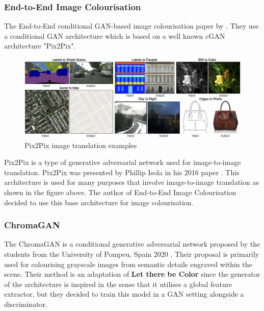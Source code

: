 \subsubsection*{End-to-End Image Colourisation}

The End-to-End conditional GAN-based image colourisation paper by \cite{inproceedings}. They use a conditional GAN architecture which is based on a well known cGAN architecture "Pix2Pix".

\begin{figure}[H]
    \centering
    \includegraphics[width=0.7\columnwidth]{sections/figures/pix2pix.png}
    \caption{Pix2Pix image translation examples}
    \label{fig:my_label}
\end{figure}

Pix2Pix is a type of generative adversarial network used for image-to-image translation. Pix2Pix was presented by Phillip Isola in his 2016 paper \cite{DBLP:journals/corr/IsolaZZE16}. This architecture is used for many purposes that involve image-to-image translation as shown in the figure above. The author of End-to-End Image Colourisation decided to use this base architecture for image colourisation.





\subsubsection*{ChromaGAN}
The ChromaGAN is a conditional generative adversarial network proposed by the students from the University of Pompeu, Spain 2020 \cite{DBLP:journals/corr/abs-1907-09837}. Their proposal is primarily used for colourising grayscale images from semantic details engraved within the scene. Their method is an adaptation of \textbf{Let there be Color} since the generator of the architecture is inspired in the sense that it utilises a global feature extractor, but they decided to train this model in a GAN setting alongside a discriminator.

